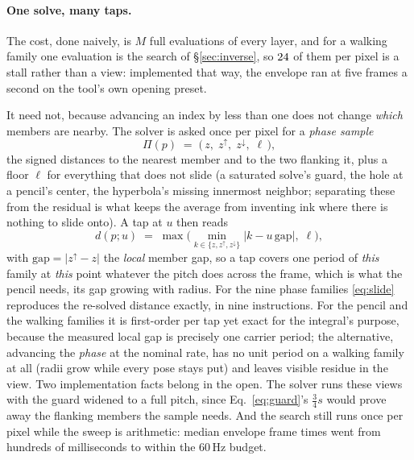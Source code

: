 \paragraph{One solve, many taps.}
The cost, done naively, is $M$ full evaluations of every layer, and for a
walking family one evaluation is the search of \S\ref{sec:inverse}, so $24$
of them per pixel is a stall rather than a view: implemented that way, the
envelope ran at five frames a second on the tool's own opening preset.

It need not, because advancing an index by less than one does not change
\emph{which} members are nearby. The solver is asked once per pixel for a
\emph{phase sample}
\begin{equation}
  \Pi(p) \;=\; \big(\,z,\; z^{\uparrow},\; z^{\downarrow},\; \ell\,\big),
  \label{eq:phasesample}
\end{equation}
the signed distances to the nearest member and to the two flanking it, plus a
floor $\ell$ for everything that does not slide (a saturated solve's guard,
the hole at a pencil's center, the hyperbola's missing innermost neighbor;
separating these from the residual is what keeps the average from inventing
ink where there is nothing to slide onto). A tap at $u$ then reads
\begin{equation}
  d(p;u) \;=\; \max\Big(\min_{k\in\{z,z^{\uparrow},z^{\downarrow}\}} \lvert k - u\,\mathrm{gap} \rvert,\; \ell\Big),
  \label{eq:slide}
\end{equation}
with $\mathrm{gap}=\lvert z^{\uparrow}-z\rvert$ the \emph{local} member gap,
so a tap covers one period of \emph{this} family at \emph{this} point
whatever the pitch does across the frame, which is what the pencil needs,
its gap growing with radius. For the nine phase families \eqref{eq:slide}
reproduces the re-solved distance exactly, in nine instructions. For the
pencil and the walking families it is first-order per tap yet exact for the
integral's purpose, because the measured local gap is precisely one carrier
period; the alternative, advancing the \emph{phase} at the nominal rate, has
no unit period on a walking family at all (radii grow while every pose stays
put) and leaves visible residue in the view. Two implementation facts belong
in the open. The solver runs these views with the guard widened to a full
pitch, since Eq.~\ref{eq:guard}'s $\tfrac34 s$ would prove away the flanking
members the sample needs. And the search still runs once per pixel while the
sweep is arithmetic: median envelope frame times went from hundreds of
milliseconds to within the 60\,Hz budget.

